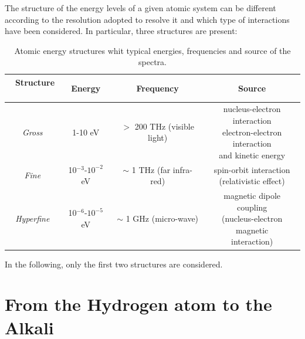 %
%



The structure of the energy levels of a given atomic system can be different according to the resolution adopted to resolve it and which type of interactions have been considered. In particular, three structures are present: 

\begin{table}[h!]
\centering
\begin{tabular}{c|c|c|c}
\toprule
 $~$ \textbf{Structure} $~$  & $~$ \textbf{Energy} $~$ & $~$ \textbf{Frequency} $~$  & $~$  \textbf{Source} $~$ \\
\hline
\textit{Gross} & 1-10 eV & \makecell{$>$ 200 THz \\ (visible light)} &\makecell{nucleus-electron interaction \\ electron-electron interaction \\ and kinetic energy} \\ %
\textit{Fine} & 10$^{-3}$-$10^{-2}$ eV & \makecell{$\sim$  1 THz \\ (far infra-red)} & \makecell{spin-orbit interaction \\ (relativistic effect)}\\ %
\textit{Hyperfine} & 10$^{-6}$-$10^{-5}$ eV & \makecell{$\sim$ 1 GHz \\ (micro-wave)} & \makecell{magnetic dipole coupling \\ (nucleus-electron magnetic \\ interaction)} \\
\bottomrule
\end{tabular}
\caption{Atomic energy structures whit typical energies, frequencies and source of the spectra. }
\label{tab:en_lev}
\end{table}

In the following, only the first two structures are considered.

\section{From the Hydrogen atom to the Alkali}

